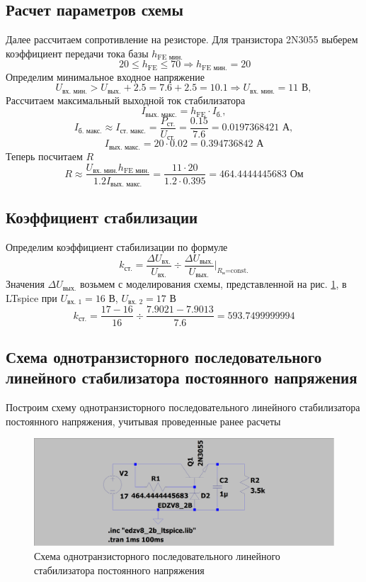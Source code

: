 \documentclass[a4paper, 12pt]{article}
\begin{document}
    
    \subsection{Расчет параметров схемы}
    Далее рассчитаем сопротивление на резисторе.
    Для транзистора 2N3055 выберем коэффициент передачи тока базы $h_{\text{FE мин.}}$
    $$\,20\leq h_{\text{FE}}\leq70\Rightarrow h_{\text{FE мин.}}=20$$
    Определим минимальное входное напряжение
    $$
    U_{\text{вх. мин.}}>U_{\text{вых.}}+2.5=7.6+2.5=10.1\Rightarrow U_{\text{вх. мин.}}=11\text{ В},
    $$
    Рассчитаем максимальный выходной ток стабилизатора
    $$
    I_{\text{вых. макс.}}=h_{\text{FE}}\cdot I_{\text{б.}},
    $$
    $$
    I_{\text{б. макс.}}\approx I_{\text{ст. макс.}}=\dfrac{P_{\text{ст.}}}{U_{\text{ст.}}}=\dfrac{0.15}{7.6}=0.0197368421\text{ А},
    $$
    $$
    I_{\text{вых. макс.}}=20\cdot0.02=0.394736842\text{ А}
    $$
    Теперь посчитаем $R$
    $$
    R\approx\dfrac{U_{\text{вх. мин.}}h_{\text{FE мин.}}}{1.2I_{\text{вых. макс.}}}=\dfrac{11\cdot20}{1.2\cdot0.395}=464.4444445683\text{ Ом}
    $$


    \subsection{Коэффициент стабилизации}
    Определим коэффициент стабилизации по формуле
    $$
    k_{\text{ст.}}=\dfrac{\Delta U_{\text{вх.}}}{U_{\text{вх.}}}\div\dfrac{\Delta U_{\text{вых.}}}{U_{\text{вых.}}}\bigg|_{R_\text{н}\text{=const.}}
    $$
    Значения $\Delta U_{\text{вых.}}$ возьмем с моделирования схемы, представленной на рис. \ref{fig:2task_scheme_AC}, в LTspice
    при $U_{\text{вх. 1}}=16$ В, $U_{\text{вх. 2}}=17$ В
    $$
    k_{\text{ст.}}=\dfrac{17-16}{16}\div\dfrac{7.9021-7.9013}{7.6}=593.7499999994
    $$


    \subsection{Схема однотранзисторного последовательного линейного стабилизатора постоянного напряжения}
    Построим схему однотранзисторного последовательного линейного стабилизатора постоянного напряжения, учитывая проведенные ранее расчеты
    \begin{figure}[H]
        \centering
        \includegraphics[scale=0.22]{2task_scheme_AC.png}
        \captionsetup{skip=0pt}
        \caption{Схема однотранзисторного последовательного линейного стабилизатора постоянного напряжения}
        \label{fig:2task_scheme_AC}
    \end{figure}
\end{document}
